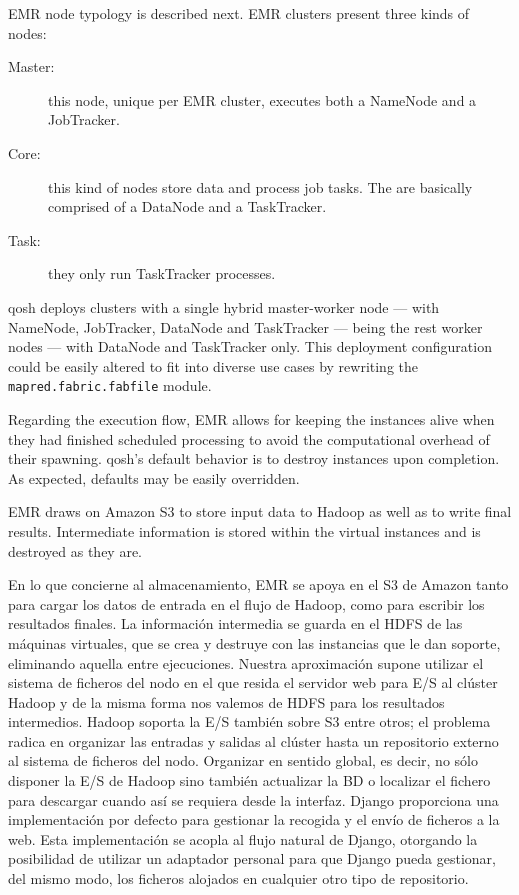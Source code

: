 EMR node typology is described next. EMR clusters present three kinds of nodes:

\begin{description}
    \item[Master:] this node, unique per EMR cluster, executes both a NameNode and a JobTracker.
    \item[Core:] this kind of nodes store data and process job tasks. The are basically comprised of a DataNode and a TaskTracker.
    \item[Task:] they only run TaskTracker processes.
\end{description}

qosh deploys clusters with a single hybrid master-worker node --- with NameNode, JobTracker, DataNode and TaskTracker --- being the rest worker nodes --- with DataNode and TaskTracker only. This deployment configuration could be easily altered to fit into diverse use cases by rewriting the \texttt{mapred.fabric.fabfile} module.

Regarding the execution flow, EMR allows for keeping the instances alive when they had finished scheduled processing to avoid the computational overhead of their spawning. qosh's default behavior is to destroy instances upon completion. As expected, defaults may be easily overridden.

EMR draws on Amazon S3 to store input data to Hadoop as well as to write final results. Intermediate information is stored within the virtual instances and is destroyed as they are.

En lo que concierne al almacenamiento, EMR se apoya en el S3 de Amazon tanto para cargar los datos de entrada en el flujo de Hadoop, como para escribir los resultados finales. La informaci\'on intermedia se guarda en el HDFS de las m\'aquinas virtuales, que se crea y destruye con las instancias que le dan soporte, eliminando aquella entre ejecuciones. Nuestra aproximaci\'on supone utilizar el sistema de ficheros del nodo en el que resida el servidor web para E/S al cl\'uster Hadoop y de la misma forma nos valemos de HDFS para los resultados intermedios. Hadoop soporta la E/S tambi\'en sobre S3 entre otros; el problema radica en organizar las entradas y salidas al cl\'uster hasta un repositorio externo al sistema de ficheros del nodo. Organizar en sentido global, es decir, no s\'olo disponer la E/S de Hadoop sino tambi\'en actualizar la BD o localizar el fichero para descargar cuando as\'i se requiera desde la interfaz. Django proporciona una implementaci\'on por defecto para gestionar la recogida y el env\'io de ficheros a la web. Esta implementaci\'on se acopla al flujo natural de Django, otorgando la posibilidad de utilizar un adaptador personal para que Django pueda gestionar, del mismo modo, los ficheros alojados en cualquier otro tipo de repositorio.



